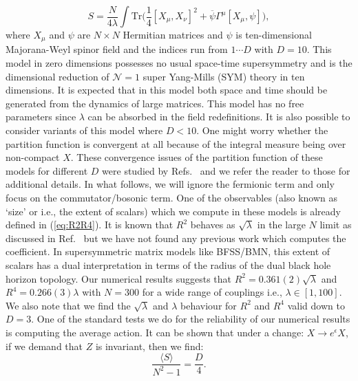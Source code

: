 \documentclass[letter,11pt]{article}
\begin{document}
\begin{equation}
	\label{eq:IKKT} 
S = \frac{N}{4\lambda} \int \mbox{Tr} \Big( \frac{1}{4} [X_\mu, X_\nu]^{2} + \overline{\psi} \Gamma^{\mu} [X_{\mu},\psi] \Big), 
\end{equation}
where $X_{\mu}$ and $\psi$ are $N \times N$ Hermitian matrices and $\psi$ is ten-dimensional Majorana-Weyl spinor field and the indices run from $ 1 \cdots D$ with $D=10$. This model in zero dimensions possesses no usual space-time supersymmetry and is the dimensional reduction of $\mathcal{N}=1$ super Yang-Mills (SYM) theory in ten dimensions. It is expected that in this model both space and time should be generated from the dynamics of large matrices. This model has no free parameters since $\lambda$ can be absorbed in the field redefinitions. It is also possible to consider variants of this model where $D < 10$. One might worry whether the partition function is convergent at all because of the integral measure being over non-compact $X$. These convergence issues of the partition function of these models for different $D$ were studied by Refs.~\cite{Krauth:1998yu,Krauth:1999qw} and we
refer the reader to those for additional details.  In what follows, we will ignore the fermionic 
term and only focus on the commutator/bosonic term. One of the observables (also known as `size' or i.e., the extent of scalars) which we compute in these models is already defined in (\ref{eq:R2R4}). It is known that $R^2$ behaves as $\sqrt{\lambda}$ in the large $N$ limit as discussed in Ref.~\cite{Hotta:1998en} but we have not found any previous work which computes the coefficient. In supersymmetric matrix models like BFSS/BMN, this extent of scalars has a dual interpretation in 
terms of the radius of 
the dual black hole horizon topology.  Our numerical results suggests 
that $R^2 = 0.361(2) \sqrt{\lambda}$ 
and $R^4 = 0.266(3) \lambda$ with $N = 300$ for a wide range of couplings i.e., 
$\lambda \in [1,100]$. 
We also note that we find the $\sqrt{\lambda}$ and $\lambda$ behaviour for 
$R^2$ and $R^4$ valid down to $D=3$. 
One of the standard tests we do for the reliability of our numerical results is 
computing the average action. It can be shown that under a 
change: $X \to e^{\epsilon} X$, if we demand that $Z$ is invariant, 
then we find:
\begin{equation}
\label{eq:SD_YMD} 
	\frac{\langle S \rangle}{N^2 - 1} = \frac{D}{4}. 
\end{equation}
\end{document}
